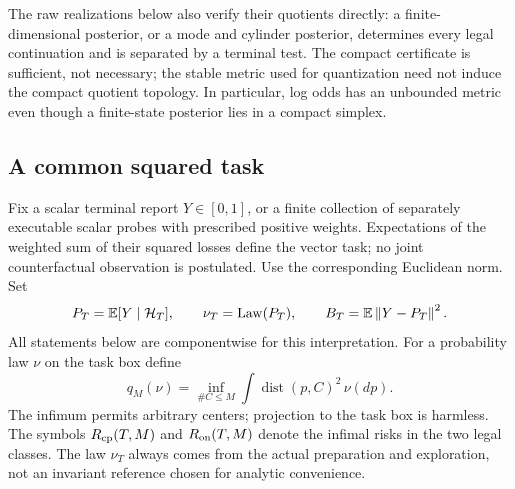 The raw realizations below also verify their quotients directly: a finite-dimensional posterior, or a mode and cylinder posterior, determines every legal continuation and is separated by a terminal test. The compact certificate is sufficient, not necessary; the stable metric used for quantization need not induce the compact quotient topology. In particular, log odds has an unbounded metric even though a finite-state posterior lies in a compact simplex.

\subsection{A common squared task}
Fix a scalar terminal report $Y\in[0,1]$, or a finite collection of separately executable scalar probes with prescribed positive weights. Expectations of the weighted sum of their squared losses define the vector task; no joint counterfactual observation is postulated. Use the corresponding Euclidean norm. Set
\begin{equation}\label{eq:score}
 P_T=\mathbb E[Y\mid\mathcal H_T],\qquad \nu_T=\operatorname{Law}(P_T),\qquad
 B_T=\mathbb E\left\lVert Y-P_T\right\rVert^2.
\end{equation}
All statements below are componentwise for this interpretation. For a probability law $\nu$ on the task box define
\begin{equation}\label{eq:q}
 q_M(\nu)=\inf_{\#C\le M}\int \operatorname{dist}(p,C)^2\,\nu(dp).
\end{equation}
The infimum permits arbitrary centers; projection to the task box is harmless. The symbols $R_{\mathrm{cp}}(T,M)$ and $R_{\mathrm{on}}(T,M)$ denote the infimal risks in the two legal classes. The law $\nu_T$ always comes from the actual preparation and exploration, not an invariant reference chosen for analytic convenience.
